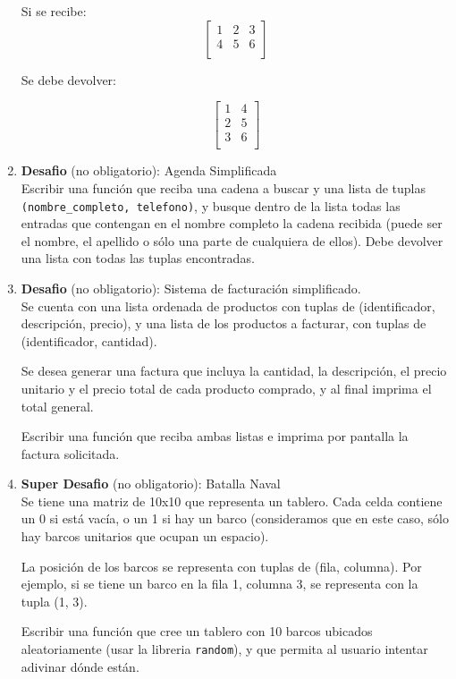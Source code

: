 \documentclass[
  letterpaper,
  DIV=11,
  numbers=noendperiod]{scrreprt}
\begin{document}
\begin{enumerate}
  Si se recibe: \[
  \begin{bmatrix}
  1 & 2 & 3  \\
  4 & 5 & 6  \\
  \end{bmatrix}
  \]

  Se debe devolver:

  \[
  \begin{bmatrix}
  1 & 4 \\
  2 & 5 \\
  3 & 6 \\
  \end{bmatrix}
  \]
\item
  \textbf{Desafio} (no obligatorio): Agenda Simplificada\\
  Escribir una función que reciba una cadena a buscar y una lista de
  tuplas \texttt{(nombre\_completo,\ telefono)}, y busque dentro de la
  lista todas las entradas que contengan en el nombre completo la cadena
  recibida (puede ser el nombre, el apellido o sólo una parte de
  cualquiera de ellos). Debe devolver una lista con todas las tuplas
  encontradas.
\item
  \textbf{Desafio} (no obligatorio): Sistema de facturación
  simplificado.\\
  Se cuenta con una lista ordenada de productos con tuplas de
  (identificador, descripción, precio), y una lista de los productos a
  facturar, con tuplas de (identificador, cantidad).

  Se desea generar una factura que incluya la cantidad, la descripción,
  el precio unitario y el precio total de cada producto comprado, y al
  final imprima el total general.

  Escribir una función que reciba ambas listas e imprima por pantalla la
  factura solicitada.
\item
  \textbf{Super Desafio} (no obligatorio): Batalla Naval\\

  Se tiene una matriz de 10x10 que representa un tablero. Cada celda
  contiene un 0 si está vacía, o un 1 si hay un barco (consideramos que
  en este caso, sólo hay barcos unitarios que ocupan un espacio).

  La posición de los barcos se representa con tuplas de (fila, columna).
  Por ejemplo, si se tiene un barco en la fila 1, columna 3, se
  representa con la tupla (1, 3).

  Escribir una función que cree un tablero con 10 barcos ubicados
  aleatoriamente (usar la libreria \texttt{random}), y que permita al
  usuario intentar adivinar dónde están.


\end{enumerate}
\end{document}
